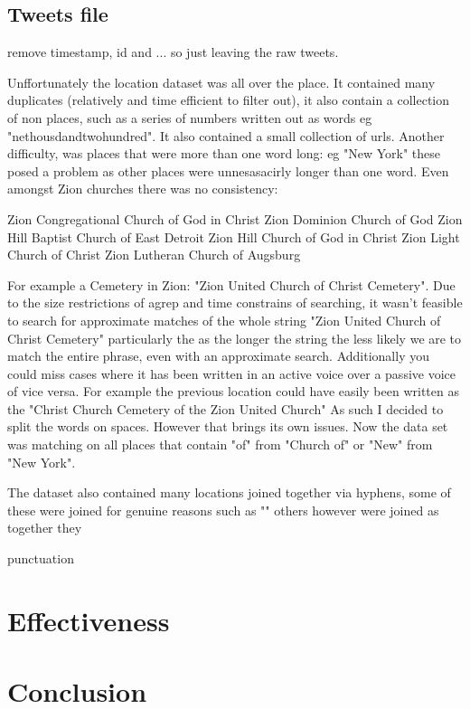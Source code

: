 \documentclass[a4paper]{article}
\begin{document}
\subsection{Tweets file}
remove timestamp, id and ... so just leaving the raw tweets.



Unffortunately the location dataset was all over the place. It contained many duplicates (relatively and time efficient to filter out), it also contain a collection of non places, such as a series of numbers written out as words  eg "nethousdandtwohundred". It also contained a small collection of urls.
Another difficulty, was places that were more than one word long: eg "New York" these posed a problem as other places were unnesasacirly longer than one word. Even amongst Zion churches there was no consistency:

Zion Congregational Church of God in Christ
Zion Dominion Church of God
Zion Hill Baptist Church of East Detroit
Zion Hill Church of God in Christ
Zion Light Church of Christ
Zion Lutheran Church of Augsburg


For example a Cemetery in Zion: "Zion United Church of Christ Cemetery". Due to the size restrictions of agrep and time constrains of searching, it wasn't feasible to search for approximate matches of the whole string "Zion United Church of Christ Cemetery"  particularly the as the longer the string the less likely we are to match the entire phrase, even with an approximate search. Additionally you could miss cases where it has been written in an active voice over a passive voice of vice versa. For example the previous location could have easily been written as the "Christ Church Cemetery of the Zion United Church" As such I decided to split the words on spaces. However that brings its own issues. Now the data set was matching on all places that contain "of" from "Church of" or "New" from "New York".


The dataset also contained many locations joined together via hyphens, some of these were joined for genuine reasons such as ""
others however were joined as together they


punctuation

\section{Effectiveness}


\section{Conclusion}
\end{document}
